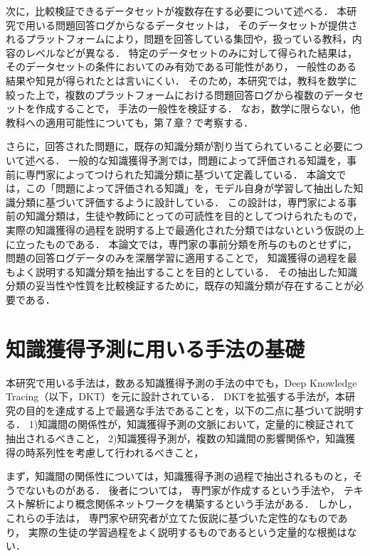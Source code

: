 次に，比較検証できるデータセットが複数存在する必要について述べる．
本研究で用いる問題回答ログからなるデータセットは，
そのデータセットが提供されるプラットフォームにより，問題を回答している集団や，扱っている教科，内容のレベルなどが異なる．
特定のデータセットのみに対して得られた結果は，そのデータセットの条件においてのみ有効である可能性があり，
一般性のある結果や知見が得られたとは言いにくい．
そのため，本研究では，教科を数学に絞った上で，複数のプラットフォームにおける問題回答ログから複数のデータセットを作成することで，
手法の一般性を検証する．
なお，数学に限らない，他教科への適用可能性についても，第７章？で考察する．


さらに，回答された問題に，既存の知識分類が割り当てられていること必要について述べる．
一般的な知識獲得予測では，問題によって評価される知識を，事前に専門家によってつけられた知識分類に基づいて定義している．
本論文では，この「問題によって評価される知識」を，モデル自身が学習して抽出した知識分類に基づいて評価するように設計している．
この設計は，専門家による事前の知識分類は，生徒や教師にとっての可読性を目的としてつけられたもので，
実際の知識獲得の過程を説明する上で最適化された分類ではないという仮説の上に立ったものである．
本論文では，専門家の事前分類を所与のものとせずに，問題の回答ログデータのみを深層学習に適用することで，
知識獲得の過程を最もよく説明する知識分類を抽出することを目的としている．
その抽出した知識分類の妥当性や性質を比較検証するために，既存の知識分類が存在することが必要である．


\section{知識獲得予測に用いる手法の基礎}
本研究で用いる手法は，数ある知識獲得予測の手法の中でも，Deep Knowledge Tracing（以下，DKT）を元に設計されている．
DKTを拡張する手法が，本研究の目的を達成する上で最適な手法であることを，以下の二点に基づいて説明する．
1)知識間の関係性が，知識獲得予測の文脈において，定量的に検証されて抽出されるべきこと，
2)知識獲得予測が，複数の知識間の影響関係や，知識獲得の時系列性を考慮して行われるべきこと，


まず，知識間の関係性については，知識獲得予測の過程で抽出されるものと，そうでないものがある．
後者については，
専門家が作成するという手法や，
テキスト解析により概念関係ネットワークを構築するという手法\cite{chen2008mining}がある．
しかし，これらの手法は，
専門家や研究者が立てた仮説に基づいた定性的なものであり，
実際の生徒の学習過程をよく説明するものであるという定量的な根拠はない．

